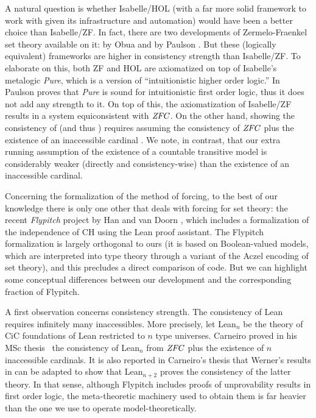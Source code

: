 A natural question is whether Isabelle/HOL (with a far more solid
framework to work with given its infrastructure and automation) would
have been a better choice than Isabelle/ZF. In fact,
there are two developments of Zermelo-Fraenkel set theory available on
it:  by Obua \cite{DBLP:conf/ictac/Obua06} and
 by Paulson
\cite{ZFC_in_HOL-AFP}. But these (logically equivalent) frameworks are
higher in consistency strength than Isabelle/ZF. To elaborate on this,
both ZF and HOL are axiomatized on top of Isabelle's metalogic
\emph{Pure}, which is a version of ``intuitionistic higher order
logic.'' In  \cite{Paulson1989} Paulson proves that \emph{Pure}
is sound for intuitionistic first order logic, thus it does not add
any strength to it. On top of this, the axiomatization of Isabelle/ZF
results in a system equiconsistent with $\mathit{ZFC}$. On the other hand,
showing the consistency of  (and thus
) requires
assuming the consistency of $\mathit{ZFC}$ plus the existence of an
inaccessible cardinal \cite[Sect.~3]{DBLP:conf/ictac/Obua06}. We note,
in contrast, that our extra running assumption of the existence of a
countable transitive model is considerably weaker (directly and
consistency-wise) than the existence of an inaccessible cardinal.

Concerning the formalization of the method of forcing, to the best of
our knowledge there is only one other that deals with forcing for
set theory: the recent \emph{Flypitch} project by Han and van Doorn
\cite{han_et_al:LIPIcs:2019:11074,DBLP:conf/cpp/HanD20}, which
includes a formalization of the independence of CH using the Lean proof
assistant. The Flypitch formalization is largely orthogonal to ours
(it is based on Boolean-valued models, which are interpreted into
type theory through a variant of the Aczel encoding of set theory),
and this precludes a direct comparison of code. But we can highlight
some conceptual differences between our development and the
corresponding fraction of Flypitch.


A first observation concerns consistency strength. The consistency of
Lean requires infinitely many inaccessibles. More precisely, let
Lean$_n$ be the theory of CiC foundations of Lean restricted to $n$
type universes.  Carneiro proved in his MSc thesis~\cite{carneiro-ms-thesis} the consistency of Lean$_n$ from $\mathit{ZFC}$ plus
the existence of $n$ inaccessible cardinals. It is also reported in
Carneiro's thesis that Werner's results in
\cite{10.5555/645869.668660} can be adapted to show that Lean$_{n+2}$
proves the consistency of the latter theory.  In that sense, although
Flypitch includes proofs of unprovability results in first order
logic, the meta-theoretic machinery used to obtain them is far heavier
than the one we use to operate model-theoretically.

